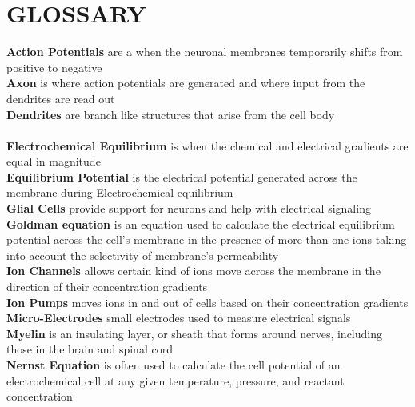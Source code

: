 \documentclass[english]{def}
\begin{document}
\section*{GLOSSARY}
\noindent\textbf{Action Potentials} are a when the neuronal membranes temporarily shifts from positive to negative\\

\noindent\textbf{Axon} is where action potentials are generated and where input from the dendrites are read out\\

\noindent\textbf{Dendrites} are branch like structures that arise from the cell body\\\\

\noindent\textbf{Electrochemical Equilibrium} is when the chemical and electrical gradients are equal in magnitude\\

\noindent\textbf{Equilibrium Potential} is the electrical potential generated across the membrane
during Electrochemical equilibrium\\

\noindent\textbf{Glial Cells} provide support for neurons and help with electrical signaling\\

\noindent\textbf{Goldman equation} is an equation used to calculate the electrical equilibrium potential across the cell's membrane in the presence of more than one ions taking into account the selectivity of membrane's permeability\\

\noindent\textbf{Ion Channels} allows certain kind of ions move across the membrane in the direction of their concentration gradients\\

\noindent\textbf{Ion Pumps} moves ions in and out of cells based on their concentration gradients\\

\noindent\textbf{Micro-Electrodes} small electrodes used to measure electrical signals\\

\noindent\textbf{Myelin} is an insulating layer, or sheath that forms around nerves, including those in the brain and spinal cord\\

\noindent\textbf{Nernst Equation} is often used to calculate the cell potential of an electrochemical cell at any given temperature, pressure, and reactant concentration\\
\end{document}
